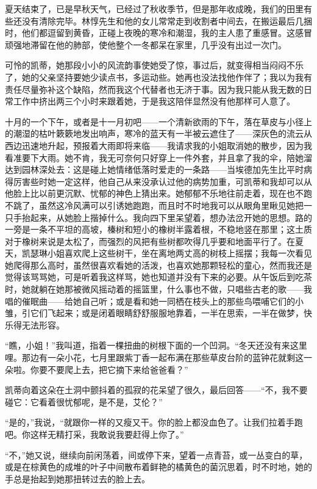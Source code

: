 \par 夏天结束了，已是早秋天气，已经过了秋收季节，但是那年收成晚，我们的田里有些还没有清除完毕。林惇先生和他的女儿常常走到收割者中间去，在搬运最后几捆时，他们都逗留到黄昏，正碰上夜晚的寒冷和潮湿，我的主人患了重感冒。这感冒顽强地滞留在他的肺部，使他整个一冬都呆在家里，几乎没有出过一次门。
\par 可怜的凯蒂，她那段小小的风流韵事使她受了惊，事过后，就变得相当闷闷不乐了，她的父亲坚持要她少读点书，多运动些。她再也没法找他作伴了；我以为我有责任尽量弥补这个缺陷，然而我这个代替者也无济于事。因为我只能从我无数的日常工作中挤出两三个小时来跟着她，于是我这陪伴显然没有他那样可人意了。
\par 十月的一个下午，或者是十一月初吧——一个清新欲雨的下午，落在草皮与小径上的潮湿的枯叶簌簌地发出响声，寒冷的蓝天有一半被云遮住了——深灰色的流云从西边迅速地升起，预报着大雨即将来临——我请求我的小姐取消她的散步，因为我看准要下大雨。她不肯，我无可奈何只好穿上一件外套，并且拿了我的伞，陪她溜达到园林深处去：这是碰上她情绪低落时爱走的一条路——当埃德加先生比平时病得厉害些时她一定这样，他自己从来没承认过他的病势加重，可凯蒂和我却可以从他脸上比以前更沉默、忧郁的神色上猜出来。她郁郁不乐地往前走着，现在也不跑不跳了，虽然这冷风满可以引诱她跑跑，而且时不时地我可以从眼角里瞅见她把一只手抬起来，从她脸上揩掉什么。我向四下里呆望着，想办法岔开她的思想。路的一旁是一条不平坦的高坡，榛树和短小的橡树半露着根，不稳地竖在那里；这土质对于橡树来说是太松了，而强烈的风把有些树都吹得几乎要和地面平行了。在夏天，凯瑟琳小姐喜欢爬上这些树干，坐在离地两丈高的树枝上摇摆；我每一次看见她爬得那么高时，虽然很喜欢看她的活泼，也喜欢她那颗轻松的童心，然而我还是觉得该骂骂她，可是听着我这样骂，她也知道并没有下来的必要。从午饭后到吃茶时，她就躺在她那被微风摇动着的摇篮里，什么事也不做，只唱些古老的歌——我唱的催眠曲——给她自己听；或是看和她一同栖在枝头上的那些鸟喂哺它们的小雏，引它们飞起来；或是闭着眼睛舒舒服服地靠着，一半在思索，一半在做梦，快乐得无法形容。
\par “瞧，小姐！”我叫道，指着一棵扭曲的树根下面的一个凹洞。“冬天还没有来这里哩。那边有一朵小花，七月里跟紫丁香一起布满在那些草皮台阶的蓝钟花就剩这一朵啦。你要不要爬上去，把它摘下来给爸爸看？”
\par 凯蒂向着这朵在土洞中颤抖着的孤寂的花呆望了很久，最后回答——“不，我不要碰它：它看着很忧郁呢，是不是，艾伦？”
\par “是的，”我说，“就跟你一样的又瘦又干。你的脸上都没血色了。让我们拉着手跑吧。你这样无精打采，我敢说我要赶得上你了。”
\par “不，”她又说，继续向前闲荡着，间或停下来，望着一点青苔，或一丛变白的草，或是在棕黄色的成堆的叶子中间散布着鲜艳的橘黄色的菌沉思着，时不时地，她的手总是抬起到她那扭转过去的脸上去。
